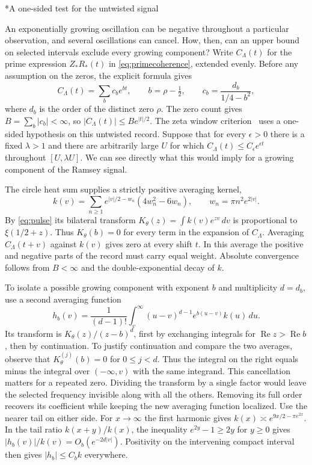 \documentclass[11pt,letterpaper]{article}
\makeatletter
\renewcommand\subsection{\@startsection{subsection}{2}{\z@}{-2.0ex plus -.3ex}{.75ex}{\normalfont\normalsize\itshape}}
\numberwithin{equation}{section}
\makeatother
\begin{document}
\subsection*{A one-sided test for the untwisted signal}
\label{app:window}

An exponentially growing oscillation can be negative throughout a particular observation, and several oscillations can cancel. How, then, can an upper bound on selected intervals exclude every growing component? Write $C_\Lambda(t)$ for the prime expression $Z_*R_*(t)$ in \eqref{eq:primecoherence}, extended evenly. Before any assumption on the zeros, the explicit formula gives
\[
 C_\Lambda(t)=\sum_b c_b e^{bt},\qquad b=\rho-\tfrac12,\qquad
 c_b=\frac{d_b}{1/4-b^2},
\]
where $d_b$ is the order of the distinct zero $\rho$. The zero count gives $B=\sum_b|c_b|<\infty$, so $|C_\Lambda(t)|\le B e^{|t|/2}$. The zeta window criterion~\cite{primeinput,primeguide} uses a one-sided hypothesis on this untwisted record. Suppose that for every $\epsilon>0$ there is a fixed $\lambda>1$ and there are arbitrarily large $U$ for which $C_\Lambda(t)\le C_\epsilon e^{\epsilon t}$ throughout $[U,\lambda U]$. We can see directly what this would imply for a growing component of the Ramsey signal.

The circle heat sum supplies a strictly positive averaging kernel,
\[
 k(v)=\sum_{n\ge1}e^{|v|/2-w_n}(4w_n^2-6w_n),
 \qquad w_n=\pi n^2 e^{2|v|}.
\]
By \eqref{eq:pulse} its bilateral transform $K_\theta(z)=\int k(v)e^{zv}\,dv$ is proportional to $\xi(1/2+z)$. Thus $K_\theta(b)=0$ for every term in the expansion of $C_\Lambda$. Averaging $C_\Lambda(t+v)$ against $k(v)$ gives zero at every shift $t$. In this average the positive and negative parts of the record must carry equal weight. Absolute convergence follows from $B<\infty$ and the double-exponential decay of $k$.

To isolate a possible growing component with exponent $b$ and multiplicity $d=d_b$, use a second averaging function
\[
 h_b(v)=\frac1{(d-1)!}\int_v^\infty (u-v)^{d-1}e^{b(u-v)}k(u)\,du .
\]
Its transform is $K_\theta(z)/(z-b)^d$, first by exchanging integrals for $\operatorname{Re} z>\operatorname{Re} b$, then by continuation. To justify continuation and compare the two averages, observe that $K_\theta^{(j)}(b)=0$ for $0\le j<d$. Thus the integral on the right equals minus the integral over $(-\infty,v)$ with the same integrand. This cancellation matters for a repeated zero. Dividing the transform by a single factor would leave the selected frequency invisible along with all the others. Removing its full order recovers its coefficient while keeping the new averaging function localized. Use the nearer tail on either side. For $x\to\infty$ the first harmonic gives $k(x)\asymp e^{9x/2-\pi e^{2x}}$. In the tail ratio $k(x+y)/k(x)$, the inequality $e^{2y}-1\ge2y$ for $y\ge0$ gives $|h_b(v)|/k(v)=O_b(e^{-2d|v|})$. Positivity on the intervening compact interval then gives $|h_b|\le C_b k$ everywhere.
\end{document}
